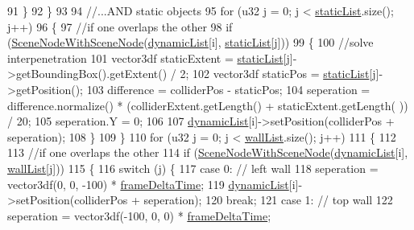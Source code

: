 \begin{DoxyCode}
91             \}
92         \}
93 
94         \textcolor{comment}{//...AND static objects}
95         \textcolor{keywordflow}{for} (u32 j = 0; j < \hyperlink{_collision_8cpp_abb9c9e616f2284236046f10dc14fa269}{staticList}.size(); j++)
96         \{
97             \textcolor{comment}{//if one overlaps the other}
98             \textcolor{keywordflow}{if} (\hyperlink{class_collision_aa2fa3418899ac7948b31eb909dea6f04}{SceneNodeWithSceneNode}(\hyperlink{_collision_8cpp_a879d8cc6abaabd771309fa0b6ef5c3ef}{dynamicList}[i], 
      \hyperlink{_collision_8cpp_abb9c9e616f2284236046f10dc14fa269}{staticList}[j]))
99             \{
100                 \textcolor{comment}{//solve interpenetration}
101                 vector3df staticExtent = \hyperlink{_collision_8cpp_abb9c9e616f2284236046f10dc14fa269}{staticList}[j]->getBoundingBox().getExtent() / 2;
102                 vector3df staticPos = \hyperlink{_collision_8cpp_abb9c9e616f2284236046f10dc14fa269}{staticList}[j]->getPosition();
103                 difference = colliderPos - staticPos;
104                 seperation = difference.normalize() * (colliderExtent.getLength() + staticExtent.getLength(
      )) / 20;
105                 seperation.Y = 0;
106 
107                 \hyperlink{_collision_8cpp_a879d8cc6abaabd771309fa0b6ef5c3ef}{dynamicList}[i]->setPosition(colliderPos + seperation);
108             \}
109         \}
110         \textcolor{keywordflow}{for} (u32 j = 0; j < \hyperlink{_collision_8cpp_a5761ec59c213fcbc17226b9df12dce77}{wallList}.size(); j++)
111         \{
112 
113             \textcolor{comment}{//if one overlaps the other}
114             \textcolor{keywordflow}{if} (\hyperlink{class_collision_aa2fa3418899ac7948b31eb909dea6f04}{SceneNodeWithSceneNode}(\hyperlink{_collision_8cpp_a879d8cc6abaabd771309fa0b6ef5c3ef}{dynamicList}[i], 
      \hyperlink{_collision_8cpp_a5761ec59c213fcbc17226b9df12dce77}{wallList}[j]))
115             \{
116                 \textcolor{keywordflow}{switch} (j) \{
117                 \textcolor{keywordflow}{case} 0: \textcolor{comment}{// left wall}
118                     seperation = vector3df(0, 0, -100) * \hyperlink{_player_8cpp_adc988571147642cda93afbf89783f9c9}{frameDeltaTime};
119                     \hyperlink{_collision_8cpp_a879d8cc6abaabd771309fa0b6ef5c3ef}{dynamicList}[i]->setPosition(colliderPos + seperation);
120                     \textcolor{keywordflow}{break};
121                 \textcolor{keywordflow}{case} 1: \textcolor{comment}{// top wall}
122                     seperation = vector3df(-100, 0, 0) * \hyperlink{_player_8cpp_adc988571147642cda93afbf89783f9c9}{frameDeltaTime};

\end{DoxyCode}
